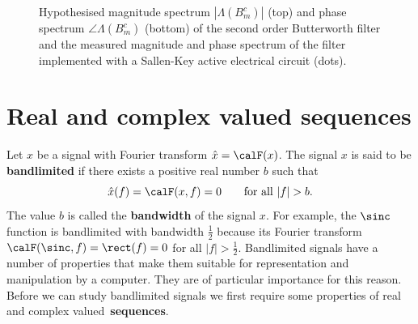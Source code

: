 \documentclass[11pt,a4paper]{book}
\theoremstyle{plain}
\numberwithin{equation}{section}
\newcommand{\term}{\textbf}
\newcommand{\abs}[1]{\left\vert #1 \right\vert}
\newcounter{test}
\begin{document}
\begin{figure}[p]
\centering
\begin{shaded}

\caption{Hypothesised magnitude spectrum $\abs{\Lambda(B_m^c)}$ (top) and phase spectrum $\angle{\Lambda(B_m^c)}$ (bottom) of the second order Butterworth filter and the measured magnitude and phase spectrum of the filter implemented with a Sallen-Key active electrical circuit (dots).}\label{fig:test:butterworthspectrum}
\end{shaded}
\end{figure}

\section{Real and complex valued sequences}

Let $x$ be a signal with Fourier transform $\hat{x} = \calF(x)$.  The signal $x$ is said to be \term{bandlimited} if there exists a positive real number $b$ such that 
\[
\hat{x}(f) = \calF(x,f) = 0 \qquad \text{for all $\abs{f} > b$}.
\]  
The value $b$ is called the \term{bandwidth} of the signal $x$.  For example, the $\sinc$ function is bandlimited with bandwidth $\tfrac{1}{2}$ because its Fourier transform $\calF(\sinc,f) = \rect(f) = 0$ for all $\abs{f} > \tfrac{1}{2}$.
Bandlimited signals have a number of properties that make them suitable for representation and manipulation by a computer.  They are of particular importance for this reason.  Before we can study bandlimited signals we first require some properties of real and complex valued~\term{sequences}.
\end{document}
